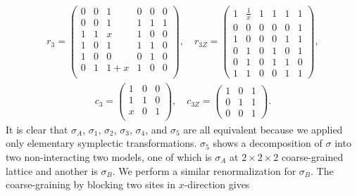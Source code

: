 \begin{align*}
r_3 =
\begin{pmatrix}
 0 & 0 & 1 & 0 & 0 & 0 \\
 0 & 0 & 1 & 1 & 1 & 1 \\
 1 & 1 & x & 1 & 0 & 0 \\
 1 & 0 & 1 & 1 & 1 & 0 \\
 1 & 0 & 0 & 0 & 1 & 0 \\
 0 & 1 & 1+x & 1 & 0 & 0  \\
\end{pmatrix},
\quad
r_{3Z} =
\begin{pmatrix}
1 & \frac{1}{x} & 1 & 1 & 1 & 1 \\
0 & 0 & 0 & 0 & 0 & 1 \\
1 & 0 & 0 & 0 & 1 & 1 \\
0 & 1 & 0 & 1 & 0 & 1 \\
0 & 1 & 0 & 1 & 1 & 0 \\
1 & 1 & 0 & 0 & 1 & 1
\end{pmatrix},
\end{align*}
\begin{align*}
c_3 =
\begin{pmatrix}
 1 & 0 & 0 \\
 1 & 1 & 0 \\
 x & 0 & 1 \\
\end{pmatrix},
\quad
c_{3Z} =
\begin{pmatrix}
1 & 0 & 1 \\
0 & 1 & 1 \\
0 & 0 & 1
\end{pmatrix}.
\end{align*}
It is clear that $\sigma_A$, $\sigma_1$, $\sigma_2$, $\sigma_3$, $\sigma_4$, and $\sigma_5$ are all equivalent
because we applied only elementary symplectic transformations.
$\sigma_5$ shows a decomposition of $\sigma$ into two non-interacting two models,
one of which is $\sigma_A$ at $2 \times 2 \times 2$ coarse-grained lattice and another is $\sigma_B$.
We perform a similar renormalization for $\sigma_B$.
The coarse-graining by blocking two sites in $x$-direction gives

